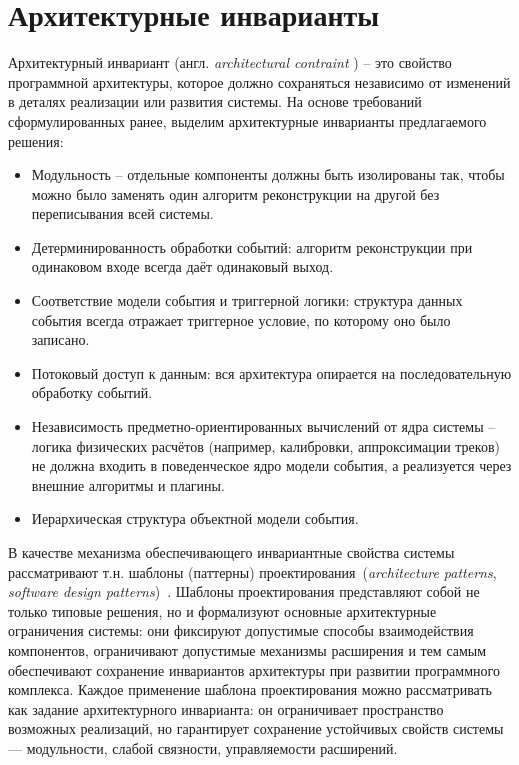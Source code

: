 \section{Архитектурные инварианты}

Архитектурный инвариант (англ. \emph{architectural contraint}
\cite{shaw-architecture-1996, bass-architecture}) --
это свойство программной архитектуры, которое должно
сохраняться независимо от изменений в деталях реализации или
развития системы. На основе требований сформулированных ранее,
выделим архитектурные инварианты предлагаемого решения:
\begin{itemize}
    \item Модульность -- отдельные компоненты должны
    быть изолированы так, чтобы можно было заменять
    один алгоритм реконструкции на другой без
    переписывания всей системы.
    \item Детерминированность обработки событий:
    алгоритм реконструкции при одинаковом входе
    всегда даёт одинаковый выход.
    \item Соответствие модели события и триггерной
    логики: структура данных события всегда отражает
    триггерное условие, по которому оно было записано.
    \item Потоковый доступ к данным: вся архитектура
    опирается на последовательную обработку событий.
    \item Независимость предметно-ориентированных
    вычислений от ядра системы -- логика физических
    расчётов (например, калибровки, аппроксимации
    треков) не должна входить в поведенческое ядро
    модели события, а реализуется через внешние алгоритмы
    и плагины.
    \item Иерархическая структура объектной модели
    события.
\end{itemize}

В качестве механизма обеспечивающего инвариантные свойства системы
рассматривают т.н. шаблоны (паттерны) проектирования~(\emph{architecture patterns}, \emph{software design patterns})~\cite{gof1994design-patterns}.
Шаблоны проектирования представляют собой не только типовые
решения, но и формализуют основные архитектурные ограничения
системы: они фиксируют допустимые способы взаимодействия
компонентов, ограничивают допустимые механизмы расширения и тем
самым обеспечивают сохранение инвариантов архитектуры при развитии
программного комплекса. Каждое применение шаблона проектирования можно
рассматривать как задание архитектурного инварианта: он ограничивает
пространство возможных реализаций, но гарантирует сохранение
устойчивых свойств системы — модульности, слабой связности, управляемости
расширений.


